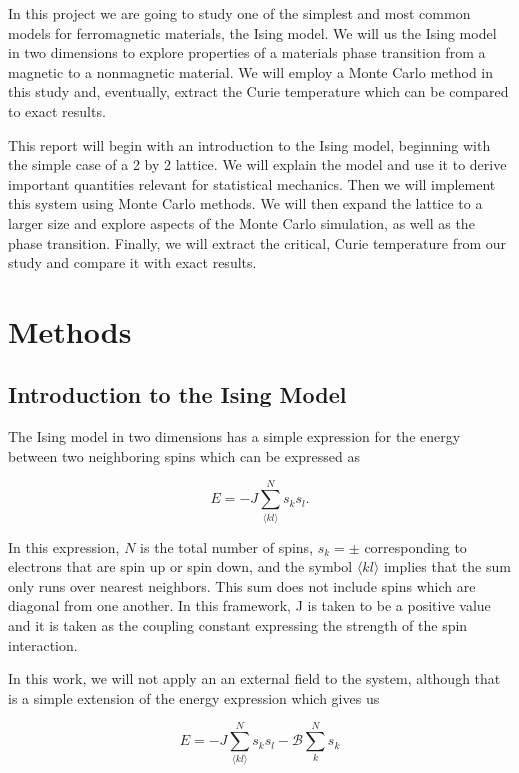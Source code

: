 \documentclass[%
oneside,                 %
final,                   %
10pt]{article}
\begin{document}
In this project we are going to study one of the simplest and most common models for ferromagnetic materials, the Ising model.  We will us the Ising model in two dimensions to explore properties of a materials phase transition from a magnetic to a nonmagnetic material.  We will employ a Monte Carlo method in this study and, eventually, extract the Curie temperature which can be compared to exact results.

This report will begin with an introduction to the Ising model, beginning with the simple case of a 2 by 2 lattice.  We will explain the model and use it to derive important quantities relevant for statistical mechanics.  Then we will implement this system using Monte Carlo methods.  We will then expand the lattice to a larger size and explore aspects of the Monte Carlo simulation, as well as the phase transition.  Finally, we will extract the critical, Curie temperature from our study and compare it with exact results.

\section{Methods}

\subsection{Introduction to the Ising Model}

The Ising model in two dimensions has a simple expression for the energy between two neighboring spins which can be expressed as

\begin{equation*}
E=-J \sum_{\langle k l \rangle}^N s_k s_l.
\end{equation*}

In this expression, $N$ is the total number of spins, $s_k = \pm$ corresponding to electrons that are spin up or spin down, and the symbol $ \langle kl \rangle$ implies that the sum only runs over nearest neighbors.  This sum does not include spins which are diagonal from one another.  In this framework, J is taken to be a positive value and it is taken as the coupling constant expressing the strength of the spin interaction.

In this work, we will not apply an an external field to the system, although that is a simple extension of the energy expression which gives us

\begin{equation*}
E=-J \sum_{\langle k l \rangle}^N s_k s_l - \mathcal{B} \sum_k^N s_k
\end{equation*}
\end{document}
